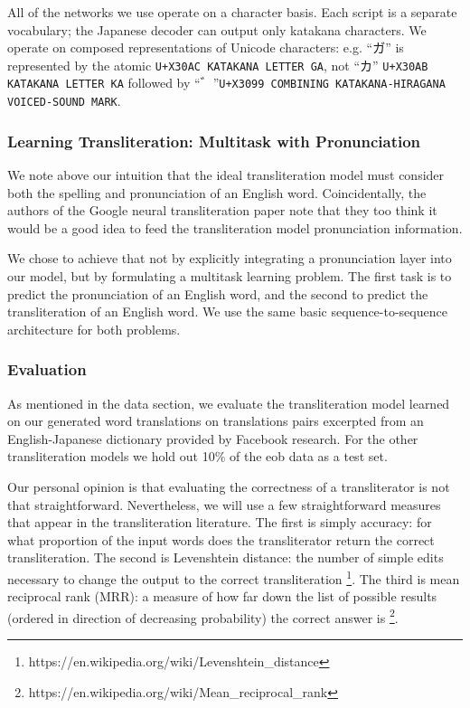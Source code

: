\documentclass{article}
\begin{document}
All of the networks we use operate on a character basis.
Each script is a separate vocabulary;
the Japanese decoder can output only katakana characters.
We operate on composed representations of Unicode characters:
e.g. ``ガ'' is represented by the atomic \texttt{U+X30AC KATAKANA LETTER GA},
not ``カ'' \texttt{U+X30AB KATAKANA LETTER KA} followed by
``゛''\texttt{U+X3099 COMBINING KATAKANA-HIRAGANA VOICED-SOUND MARK}.

\subsubsection*{Learning Transliteration: Multitask with Pronunciation}

We note above our intuition that the ideal transliteration model
must consider both the spelling and pronunciation of an English word.
Coincidentally,
the authors of the Google neural transliteration paper
\cite{Rosca2016SequencetosequenceNN}
note that they too think it would be a good idea
to feed the transliteration model pronunciation information.

We chose to achieve that not by
explicitly integrating a pronunciation layer into our model,
but by formulating a multitask learning problem.
The first task is to predict the pronunciation of an English word,
and the second to predict the transliteration of an English word.
We use the same basic sequence-to-sequence architecture for both problems.


\subsubsection*{Evaluation}

As mentioned in the data section,
we evaluate the transliteration model learned on our generated word translations
on translations pairs excerpted from an English-Japanese dictionary
provided by Facebook research.
For the other transliteration models
we hold out 10\% of the eob data as a test set.

Our personal opinion is that evaluating the correctness
of a transliterator is not that straightforward.
Nevertheless,
we will use a few straightforward measures
that appear in the transliteration literature.
The first is simply accuracy:
for what proportion of the input words
does the transliterator return the correct transliteration.
The second is Levenshtein distance:
the number of simple edits necessary to change the output to
the correct transliteration
\footnote{https://en.wikipedia.org/wiki/Levenshtein\_distance}.
The third is mean reciprocal rank (MRR):
a measure of how far down the list of possible results
(ordered in direction of decreasing probability)
the correct answer is
\footnote{https://en.wikipedia.org/wiki/Mean\_reciprocal\_rank}.
\end{document}
